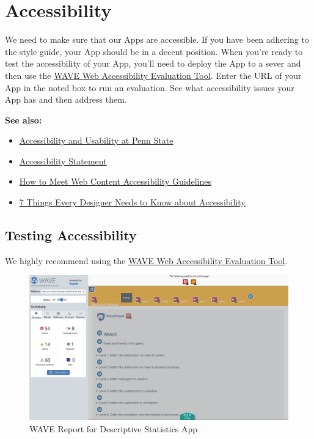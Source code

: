 \documentclass[
]{book}
\providecommand{\tightlist}{%
  \setlength{\itemsep}{0pt}\setlength{\parskip}{0pt}}
\begin{document}
\hypertarget{accessibility}{%
\chapter{Accessibility}\label{accessibility}}

We need to make sure that our Apps are accessible. If you have been adhering to the style guide, your App should be in a decent position. When you're ready to test the accessibility of your App, you'll need to deploy the App to a sever and then use the \href{https://wave.webaim.org/}{WAVE Web Accessibility Evaluation Tool}. Enter the URL of your App in the noted box to run an evaluation. See what accessibility issues your App has and then address them.

\textbf{See also:}

\begin{itemize}
\tightlist
\item
  \href{https://accessibility.psu.edu/}{Accessibility and Usability at Penn
  State}
\item
  \href{https://www.psu.edu/accessibilitystatement}{Accessibility
  Statement}
\item
  \href{https://www.w3.org/WAI/WCAG21/quickref/}{How to Meet Web Content Accessibility
  Guidelines}
\item
  \href{https://medium.com/salesforce-ux/7-things-every-designer-needs-to-know-about-accessibility-64f105f0881b}{7 Things Every Designer Needs to Know about Accessibility}
\end{itemize}

\hypertarget{testing-accessibility}{%
\section{Testing Accessibility}\label{testing-accessibility}}

We highly recommend using the \href{https://wave.webaim.org/}{WAVE Web Accessibility Evaluation Tool}.

\begin{figure}

{\centering \includegraphics[width=22.85in]{images/descStatOverview} 

}

\caption{WAVE Report for Descriptive Statistics App}\label{fig:waveDescStat}
\end{figure}
\end{document}
